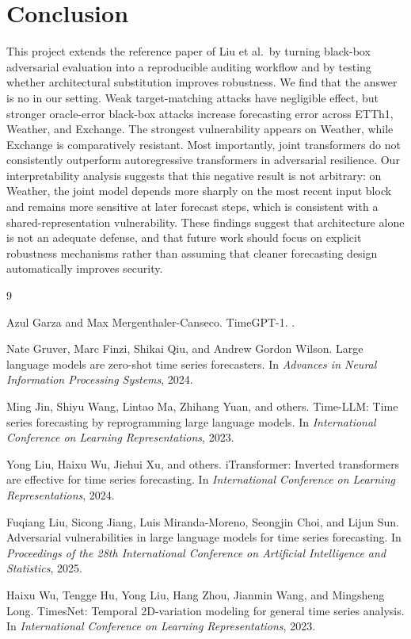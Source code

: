 \documentclass[11pt]{article}
\begin{document}
\section{Conclusion}
This project extends the reference paper of Liu et al.\ by turning black-box adversarial evaluation into a reproducible auditing workflow and by testing whether architectural substitution improves robustness. We find that the answer is no in our setting. Weak target-matching attacks have negligible effect, but stronger oracle-error black-box attacks increase forecasting error across ETTh1, Weather, and Exchange. The strongest vulnerability appears on Weather, while Exchange is comparatively resistant. Most importantly, joint transformers do not consistently outperform autoregressive transformers in adversarial resilience. Our interpretability analysis suggests that this negative result is not arbitrary: on Weather, the joint model depends more sharply on the most recent input block and remains more sensitive at later forecast steps, which is consistent with a shared-representation vulnerability. These findings suggest that architecture alone is not an adequate defense, and that future work should focus on explicit robustness mechanisms rather than assuming that cleaner forecasting design automatically improves security.

\begin{thebibliography}{9}

Azul Garza and Max Mergenthaler-Canseco.
\newblock TimeGPT-1.
.

Nate Gruver, Marc Finzi, Shikai Qiu, and Andrew Gordon Wilson.
\newblock Large language models are zero-shot time series forecasters.
\newblock In \emph{Advances in Neural Information Processing Systems}, 2024.

Ming Jin, Shiyu Wang, Lintao Ma, Zhihang Yuan, and others.
\newblock Time-LLM: Time series forecasting by reprogramming large language models.
\newblock In \emph{International Conference on Learning Representations}, 2023.

Yong Liu, Haixu Wu, Jiehui Xu, and others.
\newblock iTransformer: Inverted transformers are effective for time series forecasting.
\newblock In \emph{International Conference on Learning Representations}, 2024.

Fuqiang Liu, Sicong Jiang, Luis Miranda-Moreno, Seongjin Choi, and Lijun Sun.
\newblock Adversarial vulnerabilities in large language models for time series forecasting.
\newblock In \emph{Proceedings of the 28th International Conference on Artificial Intelligence and Statistics}, 2025.

Haixu Wu, Tengge Hu, Yong Liu, Hang Zhou, Jianmin Wang, and Mingsheng Long.
\newblock TimesNet: Temporal 2D-variation modeling for general time series analysis.
\newblock In \emph{International Conference on Learning Representations}, 2023.

\end{thebibliography}
\end{document}

